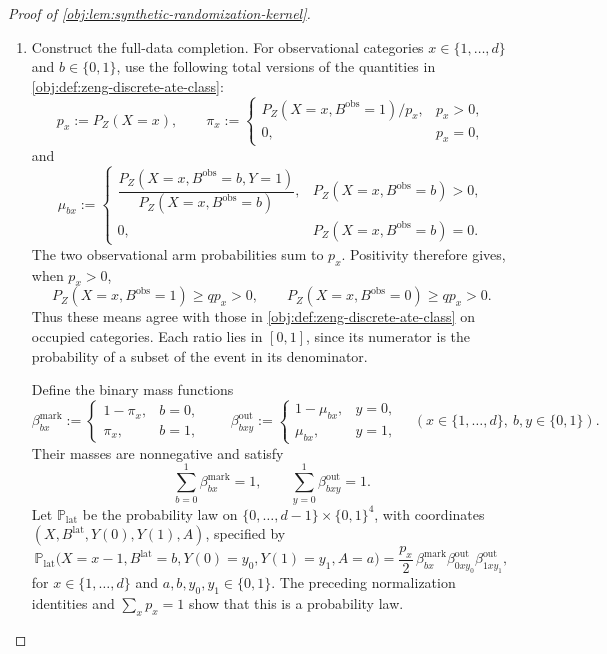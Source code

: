 \documentclass[11pt]{article}
\begin{document}
\begin{proof}[Proof of \cref{obj:lem:synthetic-randomization-kernel}]
\begin{enumerate}
\item Construct the full-data completion. For observational categories \(x\in\{1,\ldots,d\}\) and \(b\in\{0,1\}\), use the following total versions of the quantities in \cref{obj:def:zeng-discrete-ate-class}:
\[
p_x:=P_Z(X=x),\qquad
\pi_x:=
\begin{cases}
P_Z(X=x,B^{\mathrm{obs}}=1)/p_x,&p_x>0,\\
0,&p_x=0,
\end{cases}
\]
and
\[
\mu_{bx}:=
\begin{cases}
\dfrac{P_Z(X=x,B^{\mathrm{obs}}=b,Y=1)}
      {P_Z(X=x,B^{\mathrm{obs}}=b)},
&P_Z(X=x,B^{\mathrm{obs}}=b)>0,\\[6pt]
0,&P_Z(X=x,B^{\mathrm{obs}}=b)=0.
\end{cases}
\]
The two observational arm probabilities sum to \(p_x\). Positivity therefore gives, when \(p_x>0\),
\[
P_Z(X=x,B^{\mathrm{obs}}=1)\ge qp_x>0,\qquad
P_Z(X=x,B^{\mathrm{obs}}=0)\ge qp_x>0.
\]
Thus these means agree with those in \cref{obj:def:zeng-discrete-ate-class} on occupied categories. Each ratio lies in \([0,1]\), since its numerator is the probability of a subset of the event in its denominator.

Define the binary mass functions
\[
\beta^{\mathrm{mark}}_{bx}:=
\begin{cases}
1-\pi_x,&b=0,\\
\pi_x,&b=1,
\end{cases}
\qquad
\beta^{\mathrm{out}}_{bxy}:=
\begin{cases}
1-\mu_{bx},&y=0,\\
\mu_{bx},&y=1,
\end{cases}
\quad
(x\in\{1,\ldots,d\},\ b,y\in\{0,1\}).
\]
Their masses are nonnegative and satisfy
\[
\sum_{b=0}^1\beta^{\mathrm{mark}}_{bx}=1,
\qquad
\sum_{y=0}^1\beta^{\mathrm{out}}_{bxy}=1.
\]
Let \(\mathbb P_{\mathrm{lat}}\) be the probability law on
\(\{0,\ldots,d-1\}\times\{0,1\}^4\), with coordinates
\((X,B^{\mathrm{lat}},Y(0),Y(1),A)\), specified by
\[
\mathbb P_{\mathrm{lat}}
\bigl(X=x-1,B^{\mathrm{lat}}=b,Y(0)=y_0,Y(1)=y_1,A=a\bigr)
=
\frac{p_x}{2}\,
\beta^{\mathrm{mark}}_{bx}
\beta^{\mathrm{out}}_{0xy_0}
\beta^{\mathrm{out}}_{1xy_1},
\]
for \(x\in\{1,\ldots,d\}\) and \(a,b,y_0,y_1\in\{0,1\}\).
The preceding normalization identities and \(\sum_xp_x=1\) show that this is a probability law.


\end{enumerate}
\end{proof}
\end{document}
